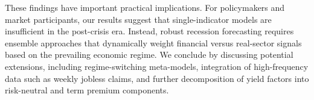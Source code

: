 These findings have important practical implications. For policymakers and market participants, our results suggest that single-indicator models are insufficient in the post-crisis era. Instead, robust recession forecasting requires ensemble approaches that dynamically weight financial versus real-sector signals based on the prevailing economic regime. We conclude by discussing potential extensions, including regime-switching meta-models, integration of high-frequency data such as weekly jobless claims, and further decomposition of yield factors into risk-neutral and term premium components.
